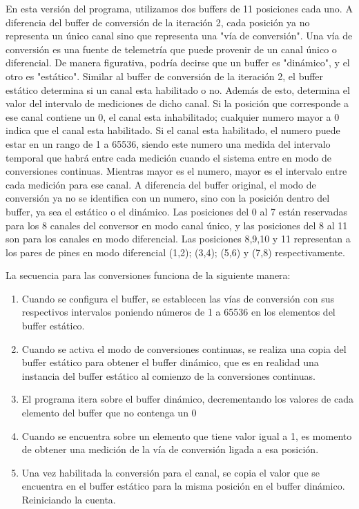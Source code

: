 En esta versión del programa, utilizamos dos buffers de 11 posiciones cada uno. A diferencia del buffer de conversión de la iteración 2, cada posición ya no representa un único canal sino que representa una "vía de conversión". Una vía de conversión es una fuente de telemetría que puede provenir de un canal único o diferencial.
De manera figurativa, podría decirse que un buffer es "dinámico", y el otro es "estático". Similar al buffer de conversión de la iteración 2, el buffer estático determina si un canal esta habilitado o no. Además de esto, determina el valor del intervalo de mediciones de dicho canal. Si la posición que corresponde a ese canal contiene un 0, el canal esta inhabilitado; cualquier numero mayor a 0 indica que el canal esta habilitado. Si el canal esta habilitado, el numero puede estar en un rango de 1 a 65536, siendo este numero una medida del intervalo temporal que habrá entre cada medición cuando el sistema entre en modo de conversiones continuas. Mientras mayor es el numero, mayor es el intervalo entre cada medición para ese canal.
A diferencia del buffer original, el modo de conversión ya no se identifica con un numero, sino con la posición dentro del buffer, ya sea el estático o el dinámico. Las posiciones del 0 al 7 están reservadas para los 8 canales del conversor en modo canal único, y las posiciones del 8 al 11 son para los canales en modo diferencial. Las posiciones 8,9,10 y 11 representan a los pares de pines en modo diferencial (1,2); (3,4); (5,6) y (7,8) respectivamente. 


La secuencia para las conversiones funciona de la siguiente manera:

\begin{enumerate}
\item Cuando se configura el buffer, se establecen las vías de conversión con sus respectivos intervalos poniendo números de 1 a 65536 en los elementos del buffer estático.
\item Cuando se activa el modo de conversiones continuas, se realiza una copia del buffer estático para obtener el buffer dinámico, que es en realidad una instancia del buffer estático al comienzo de la conversiones continuas.
\item El programa itera sobre el buffer dinámico, decrementando los valores de cada elemento del buffer que no contenga un 0
\item Cuando se encuentra sobre un elemento que tiene valor igual a 1, es momento de obtener una medición de la vía de conversión ligada a esa posición.
\item Una vez habilitada la conversión para el canal, se copia el valor que se encuentra en el buffer estático para la misma posición en el buffer dinámico. Reiniciando la cuenta.
\end{enumerate}

